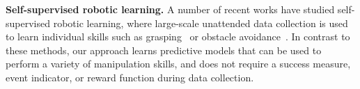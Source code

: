 
\noindent \textbf{Self-supervised robotic learning.}
A number of recent works have studied self-supervised robotic learning, where large-scale unattended data collection is used to learn individual skills such as grasping~\cite{mottaghi2016happens, lerrel,google_handeye, calandra2017feeling,pinto2016curious} or obstacle avoidance~\cite{greg_kahn_uncertainty,crashing}. 
In contrast to these methods, our approach learns predictive models that can be used to perform a variety of manipulation skills, and does not require a success measure, event indicator, or reward function during data collection.

